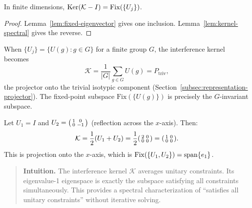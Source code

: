 \begin{corollary}
\label{cor:kernel-eigenspace}
In finite dimensions, $\mathrm{Ker}(\mathcal{K} - I) = \mathrm{Fix}(\{U_j\})$.
\end{corollary}

\begin{proof}
Lemma~\ref{lem:fixed-eigenvector} gives one inclusion.
Lemma~\ref{lem:kernel-spectral} gives the reverse.
\end{proof}

\begin{remark}
When $\{U_j\} = \{U(g) : g \in G\}$ for a finite group $G$, the interference kernel becomes
\[
\mathcal{K} = \frac{1}{|G|} \sum_{g \in G} U(g) = P_{\mathrm{triv}},
\]
the projector onto the trivial isotypic component (Section~\ref{subsec:representation-projector}).
The fixed-point subspace $\mathrm{Fix}(\{U(g)\})$ is precisely the $G$-invariant subspace.
\end{remark}

\begin{example}
\label{ex:interference-reflections}
Let $U_1 = I$ and $U_2 = \begin{psmallmatrix} 1 & 0 \\ 0 & -1 \end{psmallmatrix}$ (reflection across the $x$-axis).
Then:
\[
\mathcal{K} = \frac{1}{2}(U_1 + U_2) = \frac{1}{2}\begin{psmallmatrix} 2 & 0 \\ 0 & 0 \end{psmallmatrix} = \begin{psmallmatrix} 1 & 0 \\ 0 & 0 \end{psmallmatrix}.
\]
This is projection onto the $x$-axis, which is $\mathrm{Fix}(\{U_1, U_2\}) = \mathrm{span}\{e_1\}$.
\end{example}

\begin{quote}\small
\textbf{Intuition.}
The interference kernel $\mathcal{K}$ averages unitary constraints.
Its eigenvalue-1 eigenspace is exactly the subspace satisfying all constraints simultaneously.
This provides a spectral characterization of ``satisfies all unitary constraints'' without iterative solving.
\end{quote}
